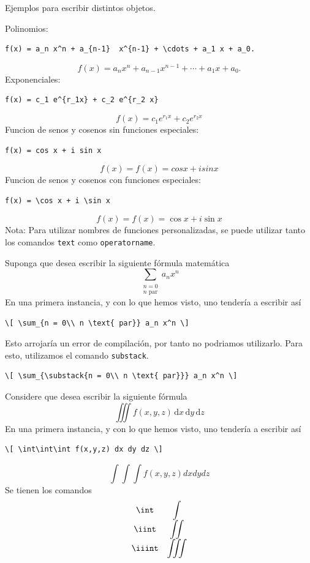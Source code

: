 \documentclass[../notes.tex]{subfiles}
\begin{document}
        Ejemplos para escribir distintos objetos.
        
        Polinomios:
            \begin{verbatim}
f(x) = a_n x^n + a_{n-1}  x^{n-1} + \cdots + a_1 x + a_0.
            \end{verbatim}
\[f(x) = a_n x^n + a_{n-1}  x^{n-1} + \cdots + a_1 x + a_0.
\]
        Exponenciales:
            \begin{verbatim}
f(x) = c_1 e^{r_1x} + c_2 e^{r_2 x}
            \end{verbatim}
\[f(x) = c_1 e^{r_1x} + c_2 e^{r_2 x}
\]
        Funcion de senos y cosenos sin funciones especiales:
            \begin{verbatim}
f(x) = cos x + i sin x
            \end{verbatim}
\[f(x) = f(x) = cos x + i sin x
\]
    Funcion de senos y cosenos con funciones especiales:
            \begin{verbatim}
f(x) = \cos x + i \sin x
            \end{verbatim}
\[f(x) = f(x) = \cos x + i \sin x
\]
        Nota: Para utilizar nombres de funciones personalizadas, se puede utilizar tanto los comandos \texttt{text} como \texttt{operatorname}.

        Suponga que desea escribir la siguiente fórmula matemática
            \[ \sum_{\substack{n = 0\\ n \text{ par}}} a_n x^n \]
        En una primera instancia, y con lo que hemos visto, uno tendería a escribir así
            \begin{verbatim}
\[ \sum_{n = 0\\ n \text{ par}} a_n x^n \]
            \end{verbatim}
        Esto arrojaría un error de compilación, por tanto no podriamos utilizarlo. Para esto, utilizamos el comando \texttt{substack}.
            \begin{verbatim}
\[ \sum_{\substack{n = 0\\ n \text{ par}}} a_n x^n \]
            \end{verbatim}
            
        Considere que desea escribir la siguiente fórmula
            \[ \iiint f(x,y,z) \, \mathrm{d}x \, \mathrm{d}y \, \mathrm{d}z \]
        En una primera instancia, y con lo que hemos visto, uno tendería a escribir así
            \begin{verbatim}
\[ \int\int\int f(x,y,z) dx dy dz \]
            \end{verbatim}
\[ \int\int\int f(x,y,z) dx dy dz \]
        Se tienen los comandos
        \[\begin{array}{cc}
            \text{\texttt{\textbackslash int}} & \displaystyle \int \\
            \text{\texttt{\textbackslash iint}} & \displaystyle\iint \\
            \text{\texttt{\textbackslash iiint}} & \displaystyle\iiint
        \end{array}\]
        
\end{document}

